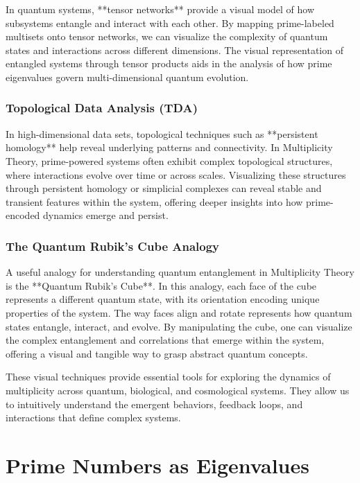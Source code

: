 \documentclass[12pt]{article}
\begin{document}
In quantum systems, **tensor networks** provide a visual model of how subsystems entangle and interact with each other. By mapping prime-labeled multisets onto tensor networks, we can visualize the complexity of quantum states and interactions across different dimensions. The visual representation of entangled systems through tensor products aids in the analysis of how prime eigenvalues govern multi-dimensional quantum evolution.

\subsubsection{Topological Data Analysis (TDA)}

In high-dimensional data sets, topological techniques such as **persistent homology** help reveal underlying patterns and connectivity. In Multiplicity Theory, prime-powered systems often exhibit complex topological structures, where interactions evolve over time or across scales. Visualizing these structures through persistent homology or simplicial complexes can reveal stable and transient features within the system, offering deeper insights into how prime-encoded dynamics emerge and persist.

\subsubsection{The Quantum Rubik’s Cube Analogy}

A useful analogy for understanding quantum entanglement in Multiplicity Theory is the **Quantum Rubik’s Cube**. In this analogy, each face of the cube represents a different quantum state, with its orientation encoding unique properties of the system. The way faces align and rotate represents how quantum states entangle, interact, and evolve. By manipulating the cube, one can visualize the complex entanglement and correlations that emerge within the system, offering a visual and tangible way to grasp abstract quantum concepts.

These visual techniques provide essential tools for exploring the dynamics of multiplicity across quantum, biological, and cosmological systems. They allow us to intuitively understand the emergent behaviors, feedback loops, and interactions that define complex systems.


\section{Prime Numbers as Eigenvalues}
\end{document}
